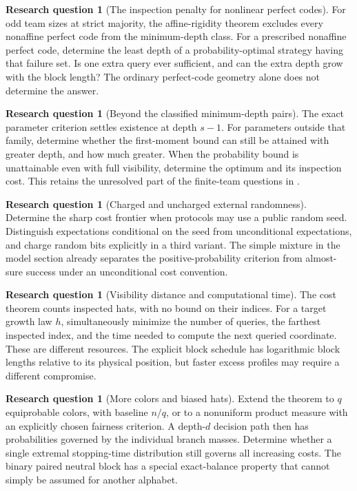\documentclass[11pt,letterpaper]{article}
\theoremstyle{definition}
\newtheorem{question}[theorem]{Research question}
\begin{document}
\begin{question}[The inspection penalty for nonlinear perfect codes]
For odd team sizes at strict majority, the affine-rigidity theorem excludes every
nonaffine perfect code from the minimum-depth class. For a prescribed
nonaffine perfect code, determine the least depth of a probability-optimal
strategy having that failure set. Is one extra query ever sufficient,
and can the extra depth grow with the block length? The ordinary
perfect-code geometry alone does not determine the answer.
\end{question}

\begin{question}[Beyond the classified minimum-depth pairs]
The exact parameter criterion settles existence at depth \(s-1\).
For parameters outside that family, determine whether the first-moment
bound can still be attained with greater depth, and how much greater.
When the probability bound is unattainable even with full visibility,
determine the optimum and its inspection cost. This retains the
unresolved part of the finite-team questions in
\cite{qry:RepoBoxes,qry:PriorHat}.
\end{question}

\begin{question}[Charged and uncharged external randomness]
Determine the sharp cost frontier when protocols may use a public
random seed. Distinguish expectations conditional on the seed from
unconditional expectations, and charge random bits explicitly in a
third variant. The simple mixture in the model section already
separates the positive-probability criterion from almost-sure success
under an unconditional cost convention.
\end{question}

\begin{question}[Visibility distance and computational time]
The cost theorem counts inspected hats, with no bound on their indices.
For a target growth law \(h\), simultaneously minimize the number of
queries, the farthest inspected index, and the time needed to compute
the next queried coordinate. These are different resources.
The explicit block schedule has logarithmic block lengths relative to
its physical position, but faster excess profiles may require a
different compromise.
\end{question}

\begin{question}[More colors and biased hats]
Extend the theorem to \(q\) equiprobable colors, with baseline \(n/q\),
or to a nonuniform product measure with an explicitly chosen fairness
criterion. A depth-\(d\) decision path then has probabilities governed
by the individual branch masses. Determine whether a single extremal
stopping-time distribution still governs all increasing costs.
The binary paired neutral block has a special exact-balance property
that cannot simply be assumed for another alphabet.
\end{question}
\end{document}
